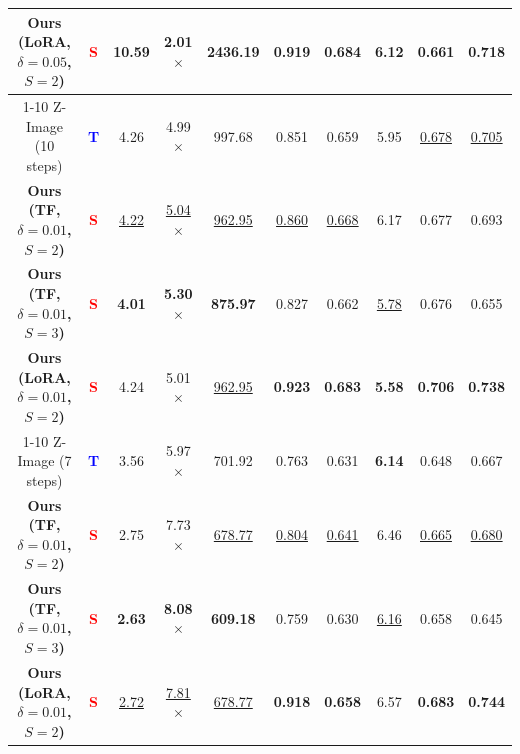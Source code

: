 \begin{table}[t!]
{\begin{scriptsize}
\begin{tabular}{cccccccccc}
        \textbf{Ours (LoRA, $\delta=0.05$, $S=2$)}     & \textcolor{red}{\textbf{S}}       & \textbf{10.59} & \textbf{2.01$\times$} & \textbf{2436.19} & 0.919 & 0.684 & 6.12 & 0.661 & 0.718 \\
        \cmidrule(lr){1-10}
        Z-Image (10 steps) & \textcolor{blue}{\textbf{T}} & 4.26 & 4.99$\times$ & 997.68 & 0.851 & 0.659 & 5.95 & \underline{0.678} & \underline{0.705} \\
        \textbf{Ours (TF, $\delta=0.01$, $S=2$)}     & \textcolor{red}{\textbf{S}}       & \underline{4.22} & \underline{5.04$\times$} & \underline{962.95} & \underline{0.860} & \underline{0.668} & 6.17 & 0.677 & 0.693 \\
        \textbf{Ours (TF, $\delta=0.01$, $S=3$)}     & \textcolor{red}{\textbf{S}}       & \textbf{4.01} & \textbf{5.30$\times$} & \textbf{875.97} & 0.827 & 0.662 & \underline{5.78} & 0.676 & 0.655 \\
        \textbf{Ours (LoRA, $\delta=0.01$, $S=2$)}     & \textcolor{red}{\textbf{S}}       &  4.24 & 5.01$\times$ & \underline{962.95} & \textbf{0.923} & \textbf{0.683} & \textbf{5.58} & \textbf{0.706} & \textbf{0.738} \\
        \cmidrule(lr){1-10}
        Z-Image (7 steps) & \textcolor{blue}{\textbf{T}} & 3.56 & 5.97$\times$ & 701.92 & 0.763 & 0.631 & \textbf{6.14} & 0.648 & 0.667 \\
        \textbf{Ours (TF, $\delta=0.01$, $S=2$)}     & \textcolor{red}{\textbf{S}}       & 2.75 & 7.73$\times$ & \underline{678.77} & \underline{0.804} & \underline{0.641} & 6.46 & \underline{0.665} & \underline{0.680} \\
        \textbf{Ours (TF, $\delta=0.01$, $S=3$)}     & \textcolor{red}{\textbf{S}}       & \textbf{2.63} & \textbf{8.08$\times$} & \textbf{609.18} & 0.759 & 0.630 & \underline{6.16} & 0.658 & 0.645 \\
        \textbf{Ours (LoRA, $\delta=0.01$, $S=2$)}     & \textcolor{red}{\textbf{S}}       & \underline{2.72} & \underline{7.81$\times$} & \underline{678.77} & \textbf{0.918} & \textbf{0.658} & 6.57 & \textbf{0.683} & \textbf{0.744} \\
        \bottomrule
    \end{tabular}
    \end{scriptsize}
    }
\end{table}
